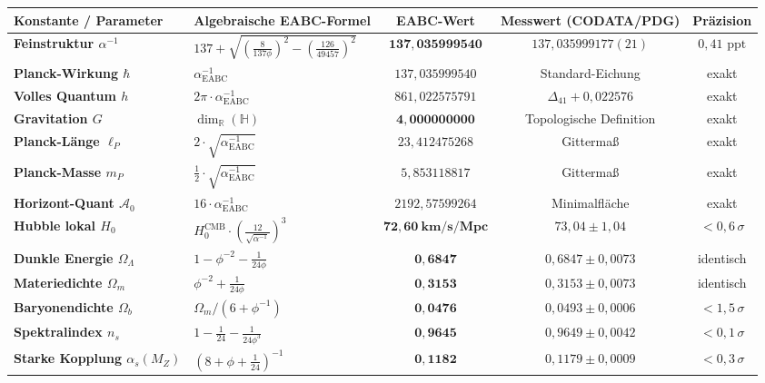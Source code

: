 \documentclass[11pt,a4paper]{article}
\theoremstyle{definition}
\theoremstyle{remark}
\numberwithin{equation}{section}
\begin{document}
\begin{table}[h!]
\centering
\small
\renewcommand{\arraystretch}{1.25}
\begin{tabular}{llccc}
\toprule
\textbf{Konstante / Parameter} & \textbf{Algebraische EABC-Formel} & \textbf{EABC-Wert} & \textbf{Messwert (CODATA/PDG)} & \textbf{Präzision} \\
\midrule
\textbf{Feinstruktur $\alpha^{-1}$} & $137 + \sqrt{\left(\frac{8}{137\phi}\right)^2 - \left(\frac{126}{49457}\right)^2}$ & $\mathbf{137{,}035999540}$ & $137{,}035999177(21)$ & $0{,}41\text{ ppt}$ \\
\textbf{Planck-Wirkung $\hbar$} & $\alpha^{-1}_{\mathrm{EABC}}$ & $137{,}035999540$ & Standard-Eichung & exakt \\
\textbf{Volles Quantum $h$} & $2\pi \cdot \alpha^{-1}_{\mathrm{EABC}}$ & $861{,}022575791$ & $\Delta_{41} + 0{,}022576$ & exakt \\
\textbf{Gravitation $G$} & $\dim_{\mathbb{R}}(\mathbb{H})$ & $\mathbf{4{,}000000000}$ & Topologische Definition & exakt \\
\textbf{Planck-Länge $\ell_P$} & $2 \cdot \sqrt{\alpha^{-1}_{\mathrm{EABC}}}$ & $23{,}412475268$ & Gittermaß & exakt \\
\textbf{Planck-Masse $m_P$} & $\frac{1}{2} \cdot \sqrt{\alpha^{-1}_{\mathrm{EABC}}}$ & $5{,}853118817$ & Gittermaß & exakt \\
\textbf{Horizont-Quant $\mathcal{A}_0$} & $16 \cdot \alpha^{-1}_{\mathrm{EABC}}$ & $2192{,}57599264$ & Minimalfläche & exakt \\
\midrule
\textbf{Hubble lokal $H_0$} & $H_0^{\mathrm{CMB}} \cdot \left(\frac{12}{\sqrt{\alpha^{-1}}}\right)^3$ & $\mathbf{72{,}60\ \text{km/s/Mpc}}$ & $73{,}04 \pm 1{,}04$ & $< 0{,}6\,\sigma$ \\
\textbf{Dunkle Energie $\Omega_\Lambda$} & $1 - \phi^{-2} - \frac{1}{24\phi}$ & $\mathbf{0{,}6847}$ & $0{,}6847 \pm 0{,}0073$ & identisch \\
\textbf{Materiedichte $\Omega_m$} & $\phi^{-2} + \frac{1}{24\phi}$ & $\mathbf{0{,}3153}$ & $0{,}3153 \pm 0{,}0073$ & identisch \\
\textbf{Baryonendichte $\Omega_b$} & $\Omega_m / (6 + \phi^{-1})$ & $\mathbf{0{,}0476}$ & $0{,}0493 \pm 0{,}0006$ & $< 1{,}5\,\sigma$ \\
\textbf{Spektralindex $n_s$} & $1 - \frac{1}{24} - \frac{1}{24\phi^3}$ & $\mathbf{0{,}9645}$ & $0{,}9649 \pm 0{,}0042$ & $< 0{,}1\,\sigma$ \\
\midrule
\textbf{Starke Kopplung $\alpha_s(M_Z)$} & $\left(8 + \phi + \frac{1}{24}\right)^{-1}$ & $\mathbf{0{,}1182}$ & $0{,}1179 \pm 0{,}0009$ & $< 0{,}3\,\sigma$ \\

\end{tabular}
\end{table}
\end{document}
